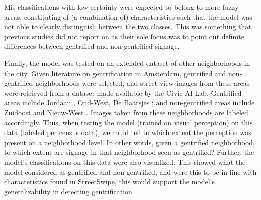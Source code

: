 Mis-classifications with low certainty were expected to belong to more fuzzy areas, constituting of (a combination of) characteristics such that the model was not able to clearly distinguish between the two classes. This was something that previous studies did not report on as their sole focus was to point out definite differences between gentrified and non-gentrified signage.

Finally, the model was tested on an extended dataset of other neighborhoods in the city. Given literature on gentrification in Amsterdam, gentrified and non-gentrified neighborhoods were selected, and street view images from these areas were retrieved from a dataset made available by the Civic AI Lab. Gentrified areas include Jordaan \cite{verlaan_hippies_2022}, Oud-West, De Baarsjes \cite{rettberg_when_2019}; and non-gentrified areas include Zuidoost and Nieuw-West \cite{pinkster_stickiness_2020}. Images taken from these neighborhoods are labeled accordingly. Thus, when testing the model (trained on visual perception) on this data (labeled per census data), we could tell to which extent the perception was present on a neighborhood level. In other words, given a gentrified neighborhood, to which extent are signage in that neighborhood seen as gentrified? Further, the model's classifications on this data were also visualized. This showed what the model considered as gentrified and non-gentrified, and were this to be in-line with characteristics found in StreetSwipe, this would support the model's generalizability in detecting gentrification.

